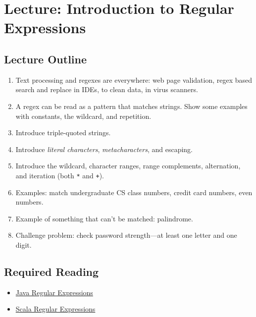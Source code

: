 \chapter{Lecture: Introduction to Regular Expressions}
\startlecture

\begin{instructor}
\section*{Lecture Outline}

\begin{enumerate}

  \item Text processing and regexes are everywhere: web page validation, regex
  based search and replace in IDEs, to clean data, in virus scanners.

  \item A regex can be read as a pattern that matches strings. Show some
  examples with constants, the wildcard, and repetition.

  \item Introduce triple-quoted strings.

  \item Introduce \emph{literal characters}, \emph{metacharacters}, and
  escaping.

  \item Introduce the wildcard, character ranges, range complements, alternation,
  and iteration (both \texttt{*} and \texttt{+}).

  \item Examples: match undergraduate CS class numbers, credit card numbers,
  even numbers.

  \item Example of something that can't be matched: palindrome.

  \item Challenge problem: check password strength---at least one letter
  and one digit.

\end{enumerate}

\end{instructor}

\section{Required Reading}

\begin{itemize}

\item \href{http://docs.oracle.com/javase/7/docs/api/java/util/regex/Pattern.html}{Java Regular Expressions}

\item \href{http://www.scala-lang.org/api/current/index.html#scala.util.matching.Regex}{Scala Regular Expressions}

\end{itemize}

